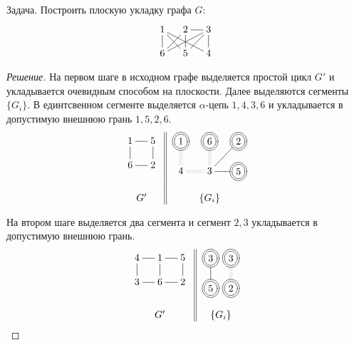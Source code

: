 \begin{exampl} Задача.
    Построить плоскую укладку графа $G$:
    \[
        {\xymatrix@=12pt{
            1 \ar@{-}[d] \ar@{-}[dr] \ar@{-}[drr]
                &2 \ar@{-}[dl] \ar@{-}[d] \ar@{-}[r]
                    &3 \ar@{-}[dll] \ar@{-}[dl] \ar@{-}[d]
                        \\
            6
                &5
                    &4
        }}
    \]
\end{exampl}
\begin{proof}[Решение]
    На первом шаге в исходном графе выделяется простой цикл $G'$ и укладывается очевидным способом на плоскости. Далее выделяются сегменты $\{G_i\}$. В единтсвенном сегменте выделяется $\alpha$-цепь $1, 4, 3, 6$ и укладывается в допустимую внешнюю грань $1, 5, 2, 6$.
    \[
        \begin{tabular}{c||c}
            {\xymatrix@=12pt{
                    1 \ar@{-}[d] \ar@{-}[r]
                        &5 \ar@{-}[d]
                            \\
                    6 \ar@{-}[r]
                        &2
            }}
            &
                {\xymatrix@=12pt{
                    *++[o][F=]{1} \ar@{:}[d]
                        &*++[o][F=]{6} \ar@{:}[d]
                            &*++[o][F=]{2} \ar@{-}[dl]
                                \\
                    4\ar@{:}[r]
                        &3 \ar@{-}[r]
                            &*++[o][F=]{5}
                }}
                    \\
            &\\
                    
            $G'$&$\{G_i\}$
        \end{tabular}
    \]
    
    На втором шаге выделяется два сегмента и сегмент $2,3$ укладывается в допустимую внешнюю грань.
    \[
        \begin{tabular}{c||c}
            {\xymatrix@=12pt{
                4 \ar@{-}[d]\ar@{-}[r]
                    &1 \ar@{-}[d] \ar@{-}[r]
                        &5 \ar@{-}[d]
                            \\
                3\ar@{-}[r]
                    &6 \ar@{-}[r]
                        &2
            }}
            &
                {\xymatrix@=12pt{
                    *++[o][F=]{3} \ar@{-}[d]
                        \\
                    *++[o][F=]{5}
                }}
                {\xymatrix@=12pt{
                    *++[o][F=]{3} \ar@{:}[d]
                        \\
                    *++[o][F=]{2}
                }}
                    \\
            &\\
            $G'$&$\{G_i\}$
        \end{tabular}
    \]
    

\end{proof}
